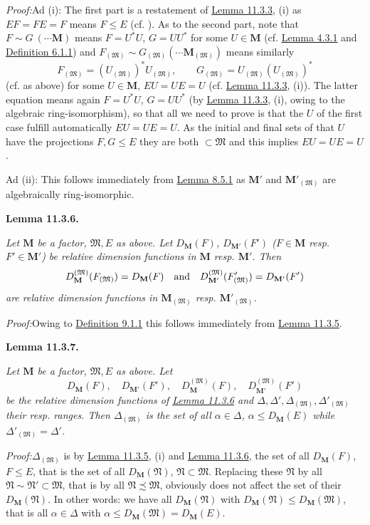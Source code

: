 \documentclass[12pt,b5paper,twoside]{article}
\newcommand{\M}{\mathbf M}
\newcommand{\Lemma}[1]{%
  \par\smallskip\noindent\phantomsection\label{lem:#1}\textbf{Lemma #1.}\enspace
}
\newcommand{\Proof}{\par\noindent\textit{Proof:}\enspace}
\newcommand{\defref}[1]{\hyperref[def:#1]{Definition #1}}
\newcommand{\lemref}[1]{\hyperref[lem:#1]{Lemma #1}}
\begin{document}
\Proof Ad (i): The first part is a restatement of \lemref{11.3.3}, (i) as
$EF=FE=F$ means $F\leq E$ (cf. \cite[p.~76]{ref16}). As to the second
part, note that $F\sim G\ (\cdots\M)$ means $F=U^*U$, $G=UU^*$ for some
$U\in\M$ (cf. \lemref{4.3.1} and \defref{6.1.1}) and
$F_{(\mathfrak M)}\sim G_{(\mathfrak M)}
(\cdots\M_{(\mathfrak M)})$ means similarly
\[
 F_{(\mathfrak M)}=(U_{(\mathfrak M)})^*U_{(\mathfrak M)},
 \qquad
 G_{(\mathfrak M)}=U_{(\mathfrak M)}(U_{(\mathfrak M)})^*
\]
(cf. as above) for some $U\in\M$, $EU=UE=U$ (cf.
\lemref{11.3.3}, (i)). The latter equation means again $F=U^*U$,
$G=UU^*$ (by \lemref{11.3.3}, (i), owing to the algebraic
ring-isomorphism), so that all we need to prove is that the $U$ of the
first case fulfill automatically $EU=UE=U$. As the initial and final sets
of that $U$ have the projections $F,G\leq E$ they are both
$\subset\mathfrak M$ and this implies $EU=UE=U$.

Ad (ii): This follows immediately from \lemref{8.5.1} as $\M'$ and
$\M'_{(\mathfrak M)}$ are algebraically ring-isomorphic.

\Lemma{11.3.6}
{\itshape
Let $\M$ be a factor, $\mathfrak M,E$ as above. Let
 $D_{\M}(F)$, $D_{\M'}(F')$ ($F\in\M$ resp. $F'\in\M'$) be relative
 dimension functions in $\M$ resp. $\M'$. Then
\[
 D_{\M}^{(\mathfrak M)}(F_{(\mathfrak M)})=D_{\M}(F)
 \quad\hbox{and}\quad
 D_{\M'}^{(\mathfrak M)}(F'_{(\mathfrak M)})=D_{\M'}(F')
\]
 are relative dimension functions in $\M_{(\mathfrak M)}$ resp.
$\M'_{(\mathfrak M)}$.}

\Proof Owing to \defref{9.1.1} this follows immediately from
\lemref{11.3.5}.

\Lemma{11.3.7}
{\itshape
Let $\M$ be a factor, $\mathfrak M,E$ as above. Let
\[
 D_{\M}(F),\quad D_{\M'}(F'),\quad
 D_{\M}^{(\mathfrak M)}(F),\quad D_{\M'}^{(\mathfrak M)}(F')
\]
be the relative dimension functions of \lemref{11.3.6} and
$\Delta,\Delta',\Delta_{(\mathfrak M)},\Delta'_{(\mathfrak M)}$ their
 resp. ranges. Then $\Delta_{(\mathfrak M)}$ is the set of all
$\alpha\in\Delta$, $\alpha\leq D_{\M}(E)$ while
$\Delta'_{(\mathfrak M)}=\Delta'$.}

\Proof $\Delta_{(\mathfrak M)}$ is by \lemref{11.3.5}, (i) and
\lemref{11.3.6}, the set of all $D_{\M}(F)$, $F\leq E$, that is the set of
all $D_{\M}(\mathfrak N)$, $\mathfrak N\subset\mathfrak M$. Replacing
these $\mathfrak N$ by all
$\mathfrak N\sim\mathfrak N'\subset\mathfrak M$, that is by all
$\mathfrak N\precsim\mathfrak M$, obviously does not affect the set of
their $D_{\M}(\mathfrak N)$. In other words: we have all
$D_{\M}(\mathfrak N)$ with
$D_{\M}(\mathfrak N)\leq D_{\M}(\mathfrak M)$, that is all
$\alpha\in\Delta$ with
$\alpha\leq D_{\M}(\mathfrak M)=D_{\M}(E)$.
\end{document}
